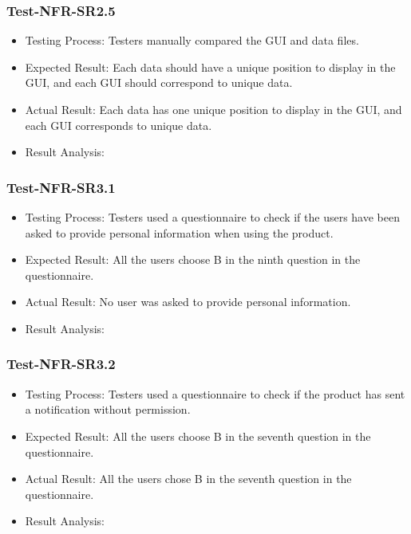 \documentclass[12pt, titlepage]{article}
\begin{document}
\subsubsection{Test-NFR-SR2.5}
\begin{itemize}
    \item Testing Process: Testers manually compared the GUI and data files.  
    \item Expected Result: Each data should have a unique position to display in the GUI, and each GUI should correspond to unique data. 
    \item Actual Result: Each data has one unique position to display in the GUI, and each GUI corresponds to unique data. 
    \item Result Analysis: \pass
\end{itemize}




\subsubsection{Test-NFR-SR3.1}
\begin{itemize}
    \item Testing Process: Testers used a questionnaire to check if the users have been asked to provide personal information when using the product.
    \item Expected Result: All the users choose B in the ninth question in the questionnaire.
    \item Actual Result: No user was asked to provide personal information.
    \item Result Analysis: \pass
\end{itemize}


\subsubsection{Test-NFR-SR3.2}
\begin{itemize}
    \item Testing Process: Testers used a questionnaire to check if the product has sent a notification without permission.
    \item Expected Result: All the users choose B in the seventh question in the questionnaire.
    \item Actual Result: All the users chose B in the seventh question in the questionnaire.
    \item Result Analysis: \pass
\end{itemize}
\end{document}

